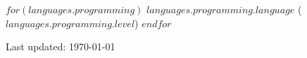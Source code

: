 \documentclass[11pt, a4paper]{article} %
\begin{document}
$for(languages.programming)$
\textsc{$languages.programming.language$} ($languages.programming.level$)
$endfor$



\vfill{} %


\begin{center}
{\scriptsize Last updated: \today} 
\end{center}

\end{document}
